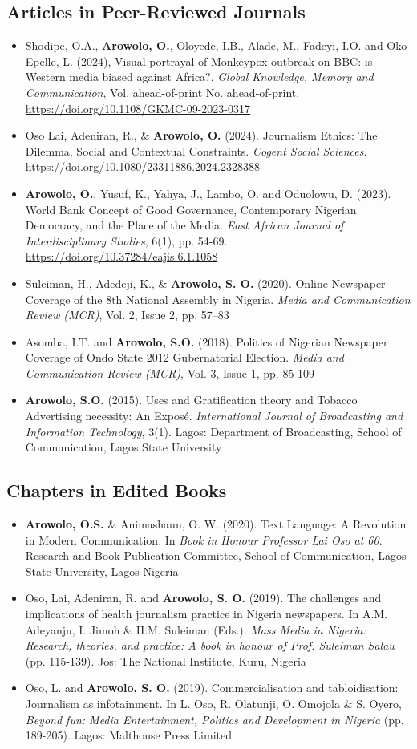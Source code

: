 \documentclass[a4paper,11pt]{article}
\newcommand{\resumeItem}[1]{
  \item\small{
    {#1 \vspace{-2pt}}
  }
}
\newcommand{\resumeItemListStart}{\begin{itemize}}
\newcommand{\resumeItemListEnd}{\end{itemize}\vspace{-5pt}}
\begin{document}
\subsection{Articles in Peer-Reviewed Journals}
    \resumeItemListStart
        \resumeItem{Shodipe, O.A., \textbf{Arowolo, O.}, Oloyede, I.B., Alade, M., Fadeyi, I.O. and Oko-Epelle, L. (2024), Visual portrayal of Monkeypox outbreak on BBC: is Western media biased against Africa?, \textit{Global Knowledge, Memory and Communication}, Vol. ahead-of-print No. ahead-of-print. \href{https://doi.org/10.1108/GKMC-09-2023-0317}{https://doi.org/10.1108/GKMC-09-2023-0317}}
        \resumeItem{Oso Lai, Adeniran, R., \& \textbf{Arowolo, O.} (2024). Journalism Ethics: The Dilemma, Social and Contextual Constraints. \textit{Cogent Social Sciences}. \href{https://doi.org/10.1080/23311886.2024.2328388}{https://doi.org/10.1080/23311886.2024.2328388}}
        \resumeItem{\textbf{Arowolo, O.}, Yusuf, K., Yahya, J., Lambo, O. and Oduolowu, D. (2023). World Bank Concept of Good Governance, Contemporary Nigerian Democracy, and the Place of the Media. \textit{East African Journal of Interdisciplinary Studies}, 6(1), pp. 54-69. \href{https://doi.org/10.37284/eajis.6.1.1058}{https://doi.org/10.37284/eajis.6.1.1058}}
        \resumeItem{Suleiman, H., Adedeji, K., \& \textbf{Arowolo, S. O.} (2020). Online Newspaper Coverage of the 8th National Assembly in Nigeria. \textit{Media and Communication Review (MCR)}, Vol. 2, Issue 2, pp. 57--83}
        \resumeItem{Asomba, I.T. and \textbf{Arowolo, S.O.} (2018). Politics of Nigerian Newspaper Coverage of Ondo State 2012 Gubernatorial Election. \textit{Media and Communication Review (MCR)}, Vol. 3, Issue 1, pp. 85-109}
        \resumeItem{\textbf{Arowolo, S.O.} (2015). Uses and Gratification theory and Tobacco Advertising necessity: An Exposé. \textit{International Journal of Broadcasting and Information Technology}, 3(1). Lagos: Department of Broadcasting, School of Communication, Lagos State University}
    \resumeItemListEnd

\subsection{Chapters in Edited Books}
    \resumeItemListStart
        \resumeItem{\textbf{Arowolo, O.S.} \& Animashaun, O. W. (2020). Text Language: A Revolution in Modern Communication. In \textit{Book in Honour Professor Lai Oso at 60}. Research and Book Publication Committee, School of Communication, Lagos State University, Lagos Nigeria}
        \resumeItem{Oso, Lai, Adeniran, R. and \textbf{Arowolo, S. O.} (2019). The challenges and implications of health journalism practice in Nigeria newspapers. In A.M. Adeyanju, I. Jimoh \& H.M. Suleiman (Eds.). \textit{Mass Media in Nigeria: Research, theories, and practice: A book in honour of Prof. Suleiman Salau} (pp. 115-139). Jos: The National Institute, Kuru, Nigeria}
        \resumeItem{Oso, L. and \textbf{Arowolo, S. O.} (2019). Commercialisation and tabloidisation: Journalism as infotainment. In L. Oso, R. Olatunji, O. Omojola \& S. Oyero, \textit{Beyond fun: Media Entertainment, Politics and Development in Nigeria} (pp. 189-205). Lagos: Malthouse Press Limited}
    \resumeItemListEnd
\end{document}
